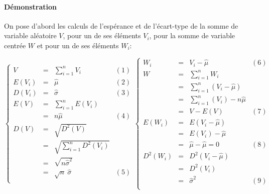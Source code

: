 \paragraph{Démonstration}
On pose d'abord les calculs de l'espérance et de l'écart-type de la somme de variable aléatoire $V$, pour un de ses éléments $V_i$, pour la somme de variable centrée $W$ et pour un de ses éléments $W_i$:
\begin{center}
$\left\{\begin{array}{LCLC}
V        &=& \sum_{i=1}^n V_i&(1)\\
E( V_i ) &=& \widehat{\mu}&(2)\\
D( V_i ) &=& \widehat{\sigma}&(3)\\
E( V )   &=& \sum_{i=1}^n E (V_i)\\
         &=& n\widehat{\mu}&(4)\\
D( V )   &=& \sqrt{D^2(V)}\\
         &=& \sqrt{\sum_{i=1}^n D^2(V_i)}\\
         &=& \sqrt{n\widehat{\sigma}^2}\\
         &=& \sqrt{n}\ \widehat{\sigma}&(5)\\
\end{array}\right.
\left\{\begin{array}{LCLC}
W_i      &=& V_i - \widehat{\mu}&(6)\\
W        &=& \sum_{i=1}^n W_i\\
         &=& \sum_{i=1}^n  (V_i - \widehat{\mu})\\
         &=& \sum_{i=1}^n  (V_i) - n\widehat{\mu}\\
         &=& V - E ( V )&(7)\\
E(W_i)   &=& E ( V_i - \widehat{\mu} )\\
         &=& E( V_i ) - \widehat{\mu}\\
         &=& \widehat{\mu} - \widehat{\mu} = 0&(8)\\
D^2(W_i) &=& D^2( V_i - \widehat{\mu} )\\
         &=& D^2( V_i )\\
         &=& \widehat{\sigma}^2&(9)\\
\end{array}\right.$
\end{center}

